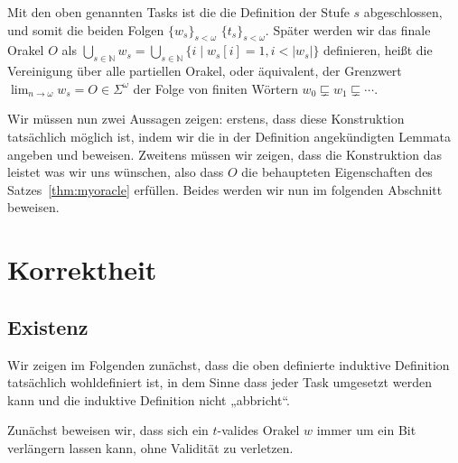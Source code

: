 Mit den oben genannten Tasks ist die die Definition der Stufe $s$ abgeschlossen, und somit die beiden Folgen $\{w_s\}_{s<\omega}$ $\{t_s\}_{s<\omega}$.
Später werden wir das finale Orakel $O$ als $\bigcup_{s\in\mathbb N} w_s = \bigcup_{s\in\mathbb N} \{ i \mid w_s[i]=1, i<|w_s|\} $ definieren, heißt die Vereinigung über alle partiellen Orakel, oder äquivalent, der Grenzwert $\lim_{n\to\omega} w_s = O\in\Sigma^\omega$ der Folge von finiten Wörtern $w_0\sqsubsetneq  w_1\sqsubsetneq \cdots$.

Wir müssen nun zwei Aussagen zeigen: erstens, dass diese Konstruktion tatsächlich möglich ist, indem wir die in der Definition angekündigten Lemmata angeben und beweisen.
Zweitens müssen wir zeigen, dass die Konstruktion das leistet was wir uns wünschen, also dass $O$ die behaupteten Eigenschaften des Satzes~\ref{thm:myoracle} erfüllen.
Beides werden wir nun im folgenden Abschnitt beweisen.

\section{Korrektheit}

\subsection*{Existenz}

Wir zeigen im Folgenden zunächst, dass die oben definierte induktive Definition tatsächlich wohldefiniert ist, in dem Sinne dass jeder Task umgesetzt werden kann und die induktive Definition nicht „abbricht“.

Zunächst beweisen wir, dass sich ein $t$-valides Orakel $w$ immer um ein Bit verlängern lassen kann, ohne Validität zu verletzen.

